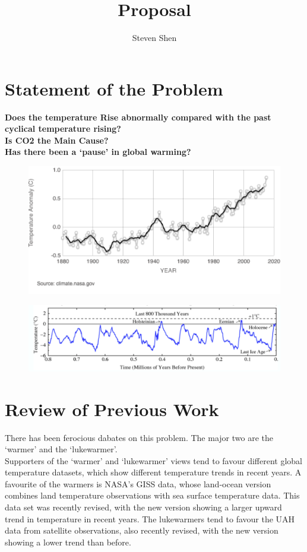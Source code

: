 \documentclass[11pt,a4paper]{paper}
\author{Steven Shen \quad \quad}
\title{Proposal}
\begin{document}
\maketitle

\section{Statement of the Problem}
\textbf{Does the temperature Rise abnormally compared with the past cyclical temperature rising?}  \\
\textbf{Is CO2 the Main Cause?} \\
\textbf{Has there been a ‘pause’ in global warming?}\\


\begin{figure}[!htb]
\centering
\includegraphics[scale=.30]{pic2.png}
\end{figure}

\begin{figure}[!htb]
\centering
\includegraphics[scale=.40]{pic1.png}
\end{figure}

\section{Review of Previous Work}
There has been ferocious dabates on this problem. The major two are the `warmer' and the `lukewarmer'.
  \\
\indent Supporters of the `warmer’ and `lukewarmer’ views tend to favour different global temperature datasets, which show different temperature trends in recent years.  A favourite of the warmers is NASA’s GISS data, whose land-ocean version combines land temperature observations with sea surface temperature data. This data set was recently revised, with the new version showing a larger upward trend in temperature in recent years. The lukewarmers tend to favour the UAH data from satellite observations, also recently revised, with the new version showing a lower trend than before.
\end{document}

